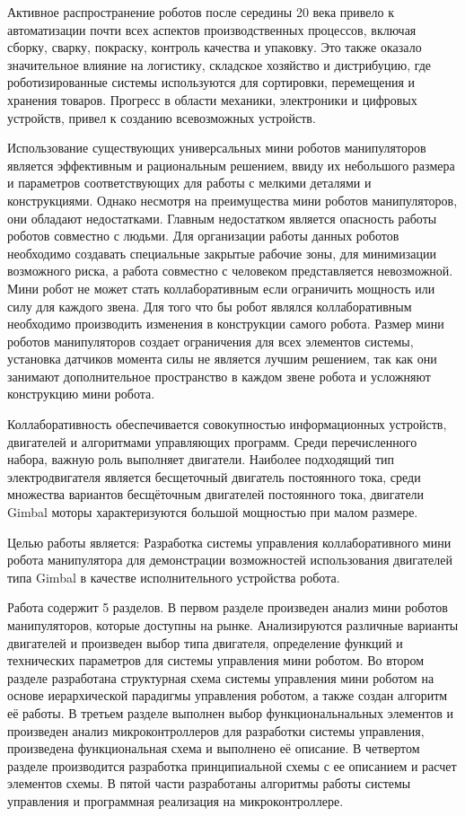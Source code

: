 

Активное распространение роботов после середины 20 века привело к автоматизации почти всех аспектов производственных процессов, включая сборку, сварку, покраску, контроль качества и упаковку. Это также оказало значительное влияние на логистику, складское хозяйство
и дистрибуцию, где роботизированные системы используются для сортировки, перемещения и
хранения товаров. Прогресс в области механики, электроники и цифровых устройств, привел к
созданию всевозможных устройств. 

Использование существующих универсальных мини роботов манипуляторов является эффективным и рациональным решением, ввиду их небольшого размера и параметров соответствующих для работы с мелкими деталями и конструкциями. Однако несмотря на преимущества мини роботов манипуляторов, они обладают недостатками. Главным недостатком является опасность работы роботов совместно с людьми. Для организации работы данных роботов необходимо создавать специальные закрытые рабочие зоны, для минимизации возможного риска, а работа совместно с человеком представляется невозможной.  
Мини робот не может стать коллаборативным если ограничить мощность или силу для каждого звена. Для того что бы робот являлся коллаборативным необходимо производить изменения в конструкции самого робота. Размер мини роботов манипуляторов создает ограничения для всех элементов системы, установка датчиков момента силы не является лучшим решением, так как они занимают дополнительное пространство в каждом звене робота и усложняют конструкцию мини робота.

Коллаборативность обеспечивается совокупностью информационных устройств, двигателей и алгоритмами управляющих программ. Среди перечисленного набора, важную роль выполняет двигатели. Наиболее подходящий тип электродвигателя является бесщеточный двигатель постоянного тока, среди множества вариантов бесщёточным двигателей постоянного тока, двигатели Gimbal моторы характеризуются большой мощностью при малом размере.

Целью работы является: Разработка системы управления коллаборативного мини робота манипулятора для демонстрации возможностей использования двигателей типа Gimbal в качестве исполнительного устройства робота.

Работа содержит 5 разделов. В первом разделе произведен анализ мини роботов манипуляторов, которые доступны на рынке. Анализируются различные варианты двигателей и произведен выбор типа двигателя, определение функций и технических параметров для системы управления мини роботом.  Во втором разделе разработана структурная схема системы управления мини роботом на основе иерархической парадигмы управления роботом, а также создан алгоритм её работы. В третьем разделе выполнен выбор функциональнальных элементов и произведен анализ микроконтроллеров для разработки системы управления, произведена функциональная схема и выполнено её описание. В четвертом разделе производится разработка принципиальной схемы с ее описанием и расчет элементов схемы. В пятой части  разработаны алгоритмы работы системы управления и программная реализация на микроконтроллере. 
